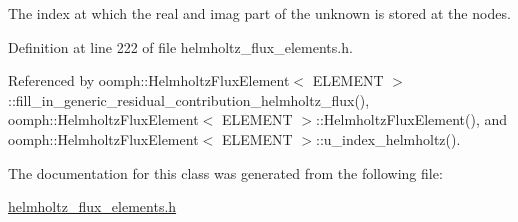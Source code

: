 The index at which the real and imag part of the unknown is stored at the nodes. 



Definition at line 222 of file helmholtz\+\_\+flux\+\_\+elements.\+h.



Referenced by oomph\+::\+Helmholtz\+Flux\+Element$<$ E\+L\+E\+M\+E\+N\+T $>$\+::fill\+\_\+in\+\_\+generic\+\_\+residual\+\_\+contribution\+\_\+helmholtz\+\_\+flux(), oomph\+::\+Helmholtz\+Flux\+Element$<$ E\+L\+E\+M\+E\+N\+T $>$\+::\+Helmholtz\+Flux\+Element(), and oomph\+::\+Helmholtz\+Flux\+Element$<$ E\+L\+E\+M\+E\+N\+T $>$\+::u\+\_\+index\+\_\+helmholtz().



The documentation for this class was generated from the following file\+:\begin{DoxyCompactItemize}
\item 
\hyperlink{helmholtz__flux__elements_8h}{helmholtz\+\_\+flux\+\_\+elements.\+h}\end{DoxyCompactItemize}
